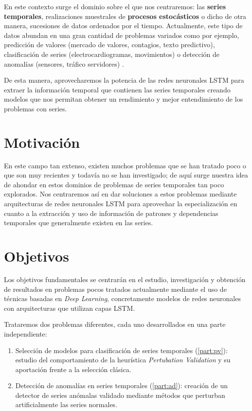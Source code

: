 En este contexto surge el dominio sobre el que nos centraremos: las \textbf{series temporales}, realizaciones muestrales de \textbf{procesos estocásticos} o dicho de otra manera, sucesiones de datos ordenados por el tiempo. Actualmente, este tipo de datos abundan en una gran cantidad de problemas variados como por ejemplo, predicción de valores (mercado de valores, contagios, texto predictivo), clasificación de series (electrocardiogramas, movimientos) o detección de anomalías (sensores, tráfico servidores) \cite{wang2017origin}.

De esta manera, aprovecharemos la potencia de las redes neuronales LSTM para extraer la información temporal que contienen las series temporales creando modelos que nos permitan obtener un rendimiento y mejor entendimiento de los problemas con series.

\section{Motivación}

En este campo tan extenso, existen muchos problemas que se han tratado poco o que son muy recientes y todavía no se han investigado; de aquí surge nuestra idea de ahondar en estos dominios de problemas de series temporales tan poco explorados. Nos centraremos así en dar soluciones a estos problemas mediante arquitecturas de redes neuronales LSTM para aprovechar la especialización en cuanto a la extracción y uso de información de patrones y dependencias temporales que generalmente existen en las series.

\section{Objetivos}

Los objetivos fundamentales se centrarán en el estudio, investigación y obtención de resultados en problemas pocos tratados actualmente mediante el uso de técnicas basadas en \emph{Deep Learning}, concretamente modelos de redes neuronales con arquitecturas que utilizan capas LSTM.

Trataremos dos problemas diferentes, cada uno desarrollados en una parte independiente:

\begin{enumerate}
  \item Selección de modelos para clasificación de series temporales (\autoref{part:pv}): estudio del comportamiento de la heurística \emph{Pertubation Validation} y su aportación frente a la selección clásica.
  \item Detección de anomalías en series temporales (\autoref{part:ad}): creación de un detector de series anómalas validado mediante métodos que perturban artificialmente las series normales.
\end{enumerate}

